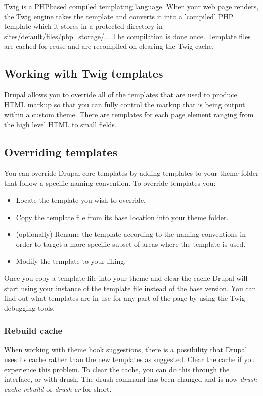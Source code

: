 Twig is a PHP­based compiled templating language. When your web page renders, the Twig engine takes the template and converts it into a 'compiled' PHP template which it stores in a protected directory in \url{sites/default/files/php_storage/...} The compilation is done once. Template files are cached for reuse and are recompiled on clearing the Twig cache.

\subsection{Working with Twig templates}
Drupal allows you to override all of the templates that are used to produce HTML markup so that you can fully control the markup that is being output within a custom theme. There are templates for each page element ranging from the high level HTML to small fields.

\subsection{Overriding templates}

You can override Drupal core templates by adding templates to your theme folder that follow a specific naming convention. To override templates you:
\begin{itemize}
	\item Locate the template you wish to override.
	\item Copy the template file from its base location into your theme folder.
	\item (optionally) Rename the template according to the naming conventions in order to target a more specific subset of areas where the template is used.
	\item Modify the template to your liking.
\end{itemize}

Once you copy a template file into your theme and clear the cache Drupal will start using your instance of the template file instead of the base version. You can find out what templates are in use for any part of the page by using the Twig debugging tools.

\subsubsection{Rebuild cache}

When working with theme hook suggestions, there is a possibility that Drupal uses its cache rather than the new templates as suggested. Clear the cache if you experience this problem. To clear the cache, you can do this through the interface, or with drush. The drush command has been changed and is now \textit{drush cache-­rebuild} or \textit{drush cr} for short.

